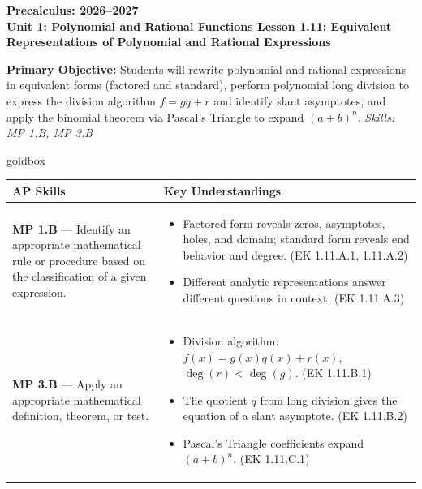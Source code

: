 \documentclass[10pt]{article}
\newcommand{\CourseName}{Precalculus}
\newcommand{\SchoolYear}{2026--2027}
\newcommand{\UnitNumberName}{Unit 1: Polynomial and Rational Functions \quad}
\newcommand{\LessonNumberName}{Lesson 1.11: Equivalent Representations of Polynomial and Rational Expressions}
\begin{document}
\begin{center}
    {\Large\bfseries \CourseName: \SchoolYear \\
    {\small\bfseries \UnitNumberName \LessonNumberName}}
\end{center}

\begin{tcolorbox}[colback=sky, colframe=navy, boxrule=0.9pt, arc=2mm,
    left=2mm, right=2mm, top=1.5mm, bottom=1.5mm]
    \textbf{Primary Objective:} Students will rewrite polynomial and rational expressions in
    equivalent forms (factored and standard), perform polynomial long division to express the
    division algorithm $f = gq + r$ and identify slant asymptotes, and apply the binomial theorem
    via Pascal's Triangle to expand $(a+b)^n$.
    \hfill\textit{\small Skills: MP 1.B, MP 3.B}
\end{tcolorbox}

\renewcommand{\arraystretch}{1.6}
\begin{skillbox}{goldbox}
\begin{tabularx}{\linewidth}{@{}X X@{}}
\textbf{AP Skills} &
\textbf{Key Understandings} \\
\midrule
\textbf{MP 1.B} --- Identify an appropriate mathematical rule or procedure based on the classification of a given expression. &
\begin{itemize}[leftmargin=1.2em,itemsep=2pt,topsep=0pt]
  \item Factored form reveals zeros, asymptotes, holes, and domain; standard form reveals end
        behavior and degree. (EK 1.11.A.1, 1.11.A.2)
  \item Different analytic representations answer different questions in context. (EK 1.11.A.3)
\end{itemize} \\
\textbf{MP 3.B} --- Apply an appropriate mathematical definition, theorem, or test. &
\begin{itemize}[leftmargin=1.2em,itemsep=2pt,topsep=0pt]
  \item Division algorithm: $f(x) = g(x)q(x) + r(x)$, $\deg(r) < \deg(g)$. (EK 1.11.B.1)
  \item The quotient $q$ from long division gives the equation of a slant asymptote. (EK 1.11.B.2)
  \item Pascal's Triangle coefficients expand $(a+b)^n$. (EK 1.11.C.1)
\end{itemize} \\
\end{tabularx}
\end{skillbox}
\end{document}
